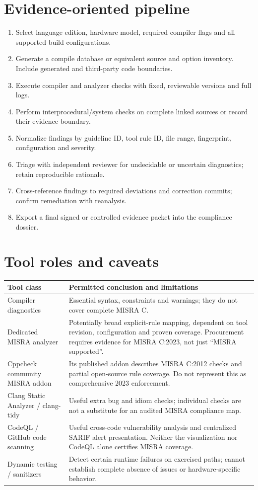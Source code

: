 \documentclass[10pt,letterpaper]{article}
\begin{document}
\section{Evidence-oriented pipeline}
\begin{enumerate}
\item Select language edition, hardware model, required compiler flags and all supported build configurations.
\item Generate a compile database or equivalent source and option inventory. Include generated and third-party code boundaries.
\item Execute compiler and analyzer checks with fixed, reviewable versions and full logs.
\item Perform interprocedural/system checks on complete linked sources or record their evidence boundary.
\item Normalize findings by guideline ID, tool rule ID, file range, fingerprint, configuration and severity.
\item Triage with independent reviewer for undecidable or uncertain diagnostics; retain reproducible rationale.
\item Cross-reference findings to required deviations and correction commits; confirm remediation with reanalysis.
\item Export a final signed or controlled evidence packet into the compliance dossier.
\end{enumerate}
\section{Tool roles and caveats}
\begin{tabularx}{\linewidth}{@{}>{\raggedright\arraybackslash}p{.25\linewidth}>{\raggedright\arraybackslash}X@{}}\toprule
\textbf{Tool class} & \textbf{Permitted conclusion and limitations}\\\midrule
Compiler diagnostics & Essential syntax, constraints and warnings; they do not cover complete MISRA C.\\
Dedicated MISRA analyzer & Potentially broad explicit-rule mapping, dependent on tool revision, configuration and proven coverage. Procurement requires evidence for MISRA C:2023, not just ``MISRA supported''.\\
Cppcheck community MISRA addon & Its published addon describes MISRA C:2012 checks and partial open-source rule coverage. Do not represent this as comprehensive 2023 enforcement.\\
Clang Static Analyzer / clang-tidy & Useful extra bug and idiom checks; individual checks are not a substitute for an audited MISRA compliance map.\\
CodeQL / GitHub code scanning & Useful cross-code vulnerability analysis and centralized SARIF alert presentation. Neither the visualization nor CodeQL alone certifies MISRA coverage.\\
Dynamic testing / sanitizers & Detect certain runtime failures on exercised paths; cannot establish complete absence of issues or hardware-specific behavior.\\\bottomrule\end{tabularx}
\end{document}
